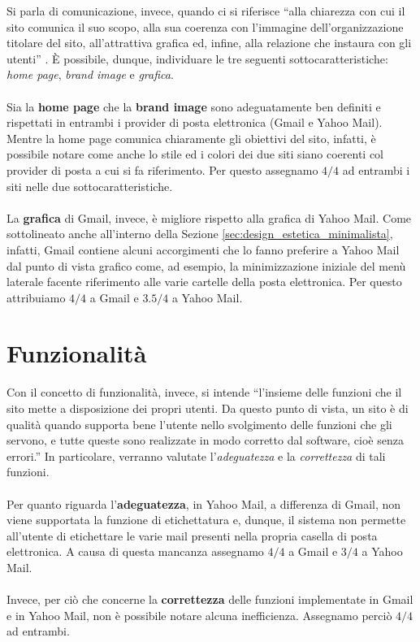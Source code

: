 		Si parla di comunicazione, invece, quando ci si riferisce ``alla chiarezza con cui il sito comunica il suo scopo, alla sua coerenza con l'immagine dell'organizzazione titolare del sito, all'attrattiva grafica ed, infine, alla relazione che instaura con gli utenti'' \cite{polillo:modello}. È possibile, dunque, individuare le tre seguenti sottocaratteristiche: \textit{home page}, \textit{brand image} e \textit{grafica}.\\
		\\
		Sia la \textbf{home page} che la \textbf{brand image} sono adeguatamente ben definiti e rispettati in entrambi i provider di posta elettronica (Gmail e Yahoo Mail). Mentre la home page comunica chiaramente gli obiettivi del sito, infatti, è possibile notare come anche lo stile ed i colori dei due siti siano coerenti col provider di posta a cui si fa riferimento. Per questo assegnamo $4/4$ ad entrambi i siti nelle due sottocaratteristiche.\\
		\\
		La \textbf{grafica} di Gmail, invece, è migliore rispetto alla grafica di Yahoo Mail. Come sottolineato anche all'interno della Sezione \ref{sec:design_estetica_minimalista}, infatti, Gmail contiene alcuni accorgimenti che lo fanno preferire a Yahoo Mail dal punto di vista grafico come, ad esempio, la minimizzazione iniziale del menù laterale facente riferimento alle varie cartelle della posta elettronica. Per questo attribuiamo $4/4$ a Gmail e $3.5/4$ a Yahoo Mail.
	
	\section{Funzionalit\`{a}} \label{sec:funzionalità}
	
		Con il concetto di funzionalità, invece, si intende ``l'insieme delle funzioni che il sito mette a disposizione dei propri utenti. Da questo punto di vista, un sito è di qualità quando supporta bene l'utente nello svolgimento delle funzioni che gli servono, e tutte queste sono realizzate in modo corretto dal software, cioè senza errori.'' \cite{polillo:modello} In particolare, verranno valutate l'\textit{adeguatezza} e la \textit{correttezza} di tali funzioni.\\
		\\
		Per quanto riguarda l'\textbf{adeguatezza}, in Yahoo Mail, a differenza di Gmail, non viene supportata la funzione di etichettatura e, dunque, il sistema non permette all'utente di etichettare le varie mail presenti nella propria casella di posta elettronica. A causa di questa mancanza assegnamo $4/4$ a Gmail e $3/4$ a Yahoo Mail.\\
		\\
		Invece, per ciò che concerne la \textbf{correttezza} delle funzioni implementate in Gmail e in Yahoo Mail, non è possibile notare alcuna inefficienza. Assegnamo perciò $4/4$ ad entrambi.
	
